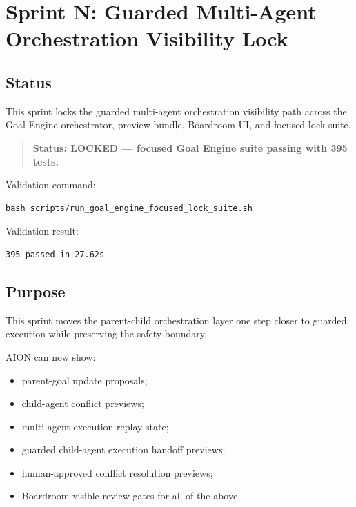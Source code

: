 \section{Sprint N: Guarded Multi-Agent Orchestration Visibility Lock}
\label{sec:sprint-n-guarded-multi-agent-orchestration-lock}

\subsection{Status}

This sprint locks the guarded multi-agent orchestration visibility path across the Goal Engine orchestrator, preview bundle, Boardroom UI, and focused lock suite.

\begin{quote}
\textbf{Status: LOCKED --- focused Goal Engine suite passing with 395 tests.}
\end{quote}

Validation command:

\begin{verbatim}
bash scripts/run_goal_engine_focused_lock_suite.sh
\end{verbatim}

Validation result:

\begin{verbatim}
395 passed in 27.62s
\end{verbatim}

\subsection{Purpose}

This sprint moves the parent-child orchestration layer one step closer to guarded execution while preserving the safety boundary.

AION can now show:

\begin{itemize}
  \item parent-goal update proposals;
  \item child-agent conflict previews;
  \item multi-agent execution replay state;
  \item guarded child-agent execution handoff previews;
  \item human-approved conflict resolution previews;
  \item Boardroom-visible review gates for all of the above.
\end{itemize}

